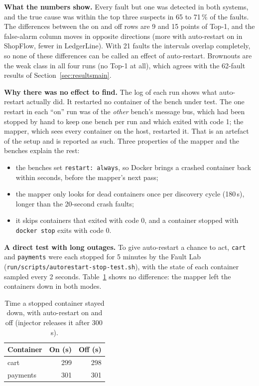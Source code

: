 \textbf{What the numbers show.} Every fault but one was detected in both systems, and the true cause was within the top three suspects in 65 to 71\,\% of the faults. The differences between the on and off rows are 9 and 15 points of Top-1, and the false-alarm column moves in opposite directions (more with auto-restart on in ShopFlow, fewer in LedgerLine). With 21 faults the intervals overlap completely, so none of these differences can be called an effect of auto-restart. Brownouts are the weak class in all four runs (no Top-1 at all), which agrees with the 62-fault results of Section~\ref{sec:resultsmain}.

\textbf{Why there was no effect to find.} The log of each run shows what auto-restart actually did. It restarted no container of the bench under test. The one restart in each ``on'' run was of the \emph{other} bench's message bus, which had been stopped by hand to keep one bench per run and which exited with code 1; the mapper, which sees every container on the host, restarted it. That is an artefact of the setup and is reported as such. Three properties of the mapper and the benches explain the rest:
\begin{itemize}
\item the benches set \texttt{restart: always}, so Docker brings a crashed container back within seconds, before the mapper's next pass;
\item the mapper only looks for dead containers once per discovery cycle (180\,s), longer than the 20-second crash faults;
\item it skips containers that exited with code 0, and a container stopped with \texttt{docker stop} exits with code 0.
\end{itemize}

\begin{sloppypar}
\textbf{A direct test with long outages.} To give auto-restart a chance to act, \texttt{cart} and \texttt{payments} were each stopped for 5 minutes by the Fault Lab (\texttt{run/scripts/autorestart-stop-test.sh}), with the state of each container sampled every 2 seconds. Table~\ref{tab:stoptest} shows no difference: the mapper left the containers down in both modes.
\end{sloppypar}

\begin{table}[!htbp]
\centering
\caption{Time a stopped container stayed down, with auto-restart on and off (injector releases it after 300\,s).}
\label{tab:stoptest}
\small
\begin{tabular}{lrr}
\toprule
\textbf{Container} & \textbf{On (s)} & \textbf{Off (s)}\\
\midrule
cart & 299 & 298\\
payments & 301 & 301\\
\bottomrule
\end{tabular}
\end{table}

